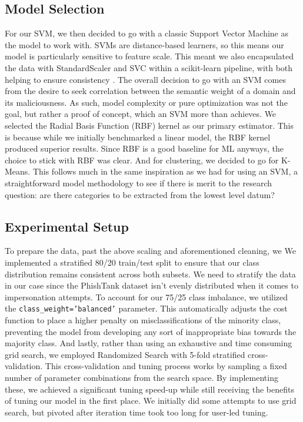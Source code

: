 \documentclass[conference]{IEEEtran}
\begin{document}
\subsection{Model Selection}
For our SVM, we then decided to go with a classic Support Vector Machine as the model to work with. SVMs are distance-based learners, so this means our model is particularly sensitive to feature scale. This meant we also encapsulated the data with StandardScaler and SVC within a scikit-learn pipeline, with both helping to ensure consistency \cite{herrera_25}. The overall decision to go with an SVM comes from the desire to seek correlation between the semantic weight of a domain and its maliciousness. As such, model complexity or pure optimization was not the goal, but rather a proof of concept, which an SVM more than achieves. We selected the Radial Basis Function (RBF) kernel as our primary estimator. This is because while we initially benchmarked a linear model, the RBF kernel produced superior results. Since RBF is a good baseline for ML anyways, the choice to stick with RBF was clear. And for clustering, we decided to go for K-Means. This follows much in the same inspiration as we had for using an SVM, a straightforward model methodology to see if there is merit to the research question: are there categories to be extracted from the lowest level datum?

\subsection{Experimental Setup}
To prepare the data, past the above scaling and aforementioned cleaning, we We implemented a stratified 80/20 train/test split to ensure that our class distribution remains consistent across both subsets. We need to stratify the data in our case since the PhishTank dataset isn't evenly distributed when it comes to impersonation attempts. To account for our 75/25 class imbalance, we utilized the \texttt{class\_weight='balanced'} parameter. This automatically adjusts the cost function to place a higher penalty on misclassifications of the minority class, preventing the model from developing any sort of inappropriate bias towards the majority class. And lastly, rather than using an exhaustive and time consuming grid search, we employed Randomized Search with 5-fold stratified cross-validation. This cross-validation and tuning process works by sampling a fixed number of parameter combinations from the search space. By implementing these, we achieved a significant tuning speed-up while still receiving the benefits of tuning our model in the first place. We initially did some attempts to use grid search, but pivoted after iteration time took too long for user-led tuning.
\end{document}
